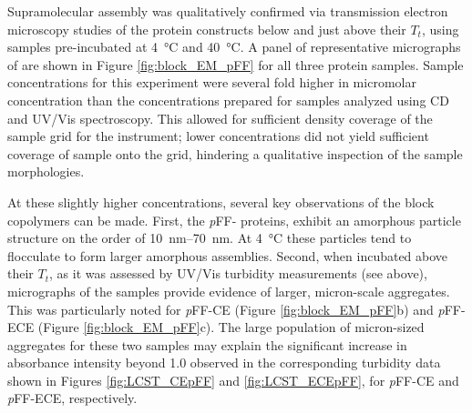 \begin{refsection}
Supramolecular assembly was qualitatively confirmed via transmission electron
microscopy studies of the protein constructs below and just above their ${T_t}$,
using samples pre-incubated at \SI{4}{\celsius} and \SI{40}{\celsius}.
A panel of representative micrographs of are shown in Figure
\ref{fig:block_EM_pFF} for all three protein samples. Sample concentrations for this
experiment were several fold higher in micromolar concentration than the
concentrations prepared for samples analyzed using CD and UV/Vis spectroscopy.
This allowed for sufficient density coverage of the sample grid for the
instrument; lower concentrations did not yield sufficient coverage of sample
onto the grid, hindering a qualitative inspection of the sample morphologies.

At these slightly higher concentrations, several key observations of the block
copolymers can be made. First, the \emph{p}FF- proteins, exhibit an amorphous
particle structure on the order of \SIrange{10}{70}{\nm}. At
\SI{4}{\celsius} these particles tend to flocculate to form larger amorphous
assemblies. Second, when incubated above their ${T_t}$, as it was assessed by
UV/Vis turbidity measurements (see above), micrographs of the samples provide
evidence of larger, micron-scale aggregates. This was particularly noted for
\emph{p}FF-CE (Figure \ref{fig:block_EM_pFF}b) and \emph{p}FF-ECE (Figure
\ref{fig:block_EM_pFF}c). The large population of micron-sized aggregates for
these two samples may explain the significant increase in absorbance intensity
beyond \SI{1.0}{\AU} observed in the corresponding turbidity data shown in Figures
\ref{fig:LCST_CEpFF} and \ref{fig:LCST_ECEpFF}, for \emph{p}FF-CE and
\emph{p}FF-ECE, respectively.


\end{refsection}
